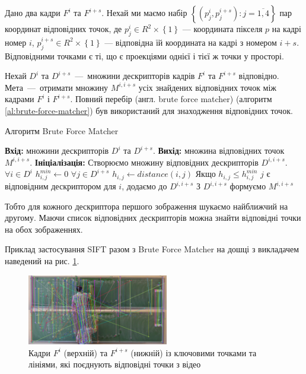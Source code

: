 Дано два кадри \(F^{i}\) та \(F^{i + s}\). Нехай ми маємо набір
\(\left\{ \left( p_{j}^{i},p_{j}^{i + s} \right):j = \overline{1,4} \right\}\)
пар координат відповідних точок, де
\(p_{j}^{i} \in R^{2} \times \left\{ 1 \right\}\) --- координата пікселя
\(p\) на кадрі номер \(i\),
\(p_{j}^{i + s} \in R^{2} \times \left\{ 1 \right\}\) --- відповідна їй
координата на кадрі з номером \(i + s\). Відповідними точками є ті, що є
проекціями однієї і тієї ж точки у просторі.

Нехай $D^i$ та $D^{i+s}$~---~множини дескрипторів кадрів \(F^{i}\) та \(F^{i + s}\)
відповідно. Мета~---~отримати множину \(M^{i,i+s}\) усіх знайдених відповідних точок  між кадрами
\(F^{i}\) і \(F^{i + s}\).
Повний перебір (англ. brute force matcher) (алгоритм \ref{al:brute-force-matcher})
був використаний для знаходження відповідних точок.

\begin{algorithm}[H]
    \caption{Алгоритм Brute Force Matcher}
    \label{al:brute-force-matcher}
    \begin{algorithmic}
        \State \textbf{Вхід:} множини дескрипторів $D^i$ та $D^{i+s}$.
        \State \textbf{Вихід:} множина відповідних точок \(M^{i,i+s}\).
        \State \textbf{Ініціалізація:} Створюємо множину відповідних дескрипторів $D^{i,i+s}$.
        \State $\forall i \in D^i$
        \State  \qquad $h^{min}_{i,j} \gets 0$
        \State  \qquad  $\forall j \in D^{i+s}$
        \State  \qquad \qquad  $h_{i,j} \gets distance(i,j)$
        \State  \qquad \qquad  Якщо {$h_{i,j} \leq h^{min}_{i,j}$}
        \State  \qquad \qquad  \qquad $j$ є відповідним  дескриптором для $i$, додаємо до  $D^{i,i+s}$
        \State З $D^{i,i+s}$ формуємо \(M^{i,i+s}\)
    \end{algorithmic}
\end{algorithm}

Тобто для кожного дескриптора першого зображення шукаємо найближчий на другому.
Маючи список відповідних дескрипторів можна знайти відповідні точки на обох зображеннях.

Приклад застосування SIFT разом з Brute Force Matcher на
дошці з викладачем наведений на рис. \ref{fig:matches_img}.

\begin{figure}[H]
    \centering
    \includegraphics[width=0.55\textwidth]{images/matches_img}
    \caption{Кадри $F^i$ (верхній) та $F^{i+s}$ (нижній) із ключовими точками та лініями,
        які поєднують відповідні точки з відео \cite{yakovlev_discrete_math_video}
        \label{fig:matches_img}
    }
\end{figure}

